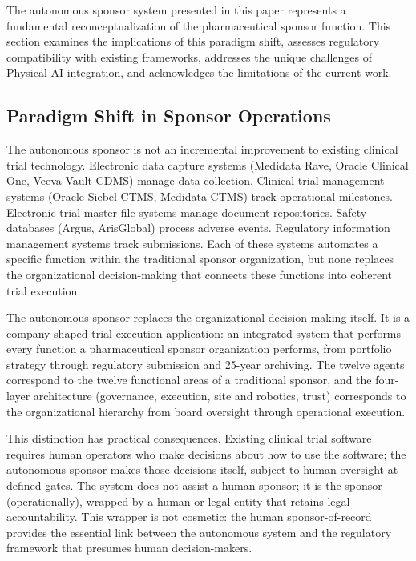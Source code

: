 
The autonomous sponsor system presented in this paper represents a fundamental
reconceptualization of the pharmaceutical sponsor function. This section examines the
implications of this paradigm shift, assesses regulatory compatibility with existing
frameworks, addresses the unique challenges of Physical AI integration, and acknowledges
the limitations of the current work.

\subsection{Paradigm Shift in Sponsor Operations}

The autonomous sponsor is not an incremental improvement to existing clinical trial
technology. Electronic data capture systems (Medidata Rave, Oracle Clinical One, Veeva
Vault CDMS) manage data collection. Clinical trial management systems (Oracle Siebel CTMS,
Medidata CTMS) track operational milestones. Electronic trial master file systems manage
document repositories. Safety databases (Argus, ArisGlobal) process adverse events.
Regulatory information management systems track submissions. Each of these systems automates
a specific function within the traditional sponsor organization, but none replaces the
organizational decision-making that connects these functions into coherent trial execution.

The autonomous sponsor replaces the organizational decision-making itself. It is a
company-shaped trial execution application: an integrated system that performs every function
a pharmaceutical sponsor organization performs, from portfolio strategy through regulatory
submission and 25-year archiving. The twelve agents correspond to the twelve functional areas
of a traditional sponsor, and the four-layer architecture (governance, execution, site and
robotics, trust) corresponds to the organizational hierarchy from board oversight through
operational execution.

This distinction has practical consequences. Existing clinical trial software requires human
operators who make decisions about how to use the software; the autonomous sponsor makes
those decisions itself, subject to human oversight at defined gates. The system does not
assist a human sponsor; it is the sponsor (operationally), wrapped by a human or legal
entity that retains legal accountability. This wrapper is not cosmetic: the human
sponsor-of-record provides the essential link between the autonomous system and the
regulatory framework that presumes human decision-makers.

